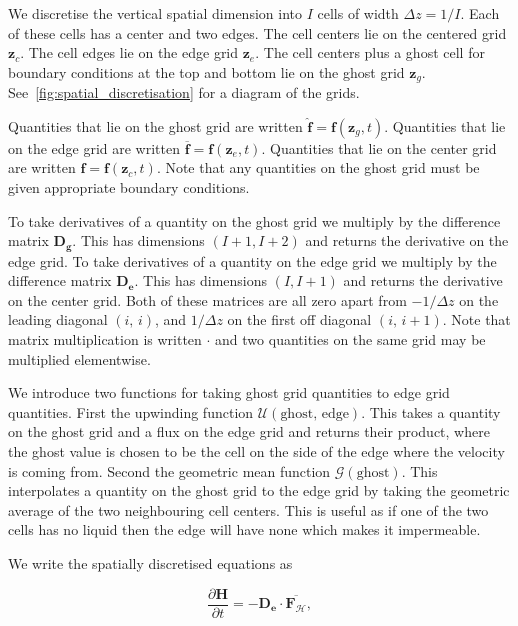 \documentclass[a4paper,11pt]{article}
\numberwithin{equation}{section}
\begin{document}
We discretise the vertical spatial dimension into $I$ cells of width $\Delta z=1 / I$.
Each of these cells has a center and two edges.
The cell centers lie on the centered grid $\boldsymbol{z}_c$.
The cell edges lie on the edge grid $\boldsymbol{z}_e$.
The cell centers plus a ghost cell for boundary conditions at the top and bottom lie on the ghost grid $\boldsymbol{z}_g$.
See~\cref{fig:spatial_discretisation} for a diagram of the grids.


Quantities that lie on the ghost grid are written $\hat{\boldsymbol{f}}=\boldsymbol{f}(\boldsymbol{z}_g, t)$.
Quantities that lie on the edge grid are written $\overline{\boldsymbol{f}}=\boldsymbol{f}(\boldsymbol{z}_e, t)$.
Quantities that lie on the center grid are written $\boldsymbol{f}=\boldsymbol{f}(\boldsymbol{z}_c, t)$.
Note that any quantities on the ghost grid must be given appropriate boundary conditions.


To take derivatives of a quantity on the ghost grid we multiply by the difference matrix $\boldsymbol{D_g}$.
This has dimensions $(I+1, I+2)$ and returns the derivative on the edge grid.
To take derivatives of a quantity on the edge grid we multiply by the difference matrix $\boldsymbol{D_e}$.
This has dimensions $(I, I+1)$ and returns the derivative on the center grid.
Both of these matrices are all zero apart from $-1 / \Delta z$ on the leading diagonal  $(i, \, i)$,
and  $1 / \Delta z$ on the first off diagonal $(i, \, i+1)$.
Note that matrix multiplication is written  $\cdot$ and two quantities on the same grid may be multiplied elementwise.

We introduce two functions for taking ghost grid quantities to edge grid quantities.
First the upwinding function $\mathcal{U}(\text{ghost}, \, \text{edge})$.
This takes a quantity on the ghost grid and a flux on the edge grid and returns their product,
where the ghost value is chosen to be the cell on the side of the edge where the velocity is coming from.
Second the geometric mean function $\mathcal{G}(\text{ghost})$.
This interpolates a quantity on the ghost grid to the edge grid by taking the geometric average of the two neighbouring cell centers.
This is useful as if one of the two cells has no liquid then the edge will have none which makes it impermeable.


We write the spatially discretised equations as

\begin{equation}\label{eq:discretised-enthalpy}
\frac{\partial \mathcal{\boldsymbol{H}}}{\partial t} = -\boldsymbol{D_e} \cdot \overline{\boldsymbol{F}_\mathcal{H}},
\end{equation}
\end{document}
